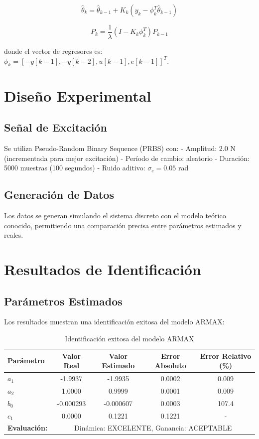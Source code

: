 \documentclass[a4paper,openright,9pt]{report}
\begin{document}
\[
\hat{\theta}_k = \hat{\theta}_{k-1} + K_k (y_k - \phi_k^T \hat{\theta}_{k-1})
\]

\[
P_k = \frac{1}{\lambda} (I - K_k \phi_k^T) P_{k-1}
\]

donde el vector de regresores es: $\phi_k = [-y[k-1], -y[k-2], u[k-1], e[k-1]]^T$.

\section{Diseño Experimental}

\subsection{Señal de Excitación}

Se utiliza Pseudo-Random Binary Sequence (PRBS) con:
- Amplitud: 2.0 N (incrementada para mejor excitación)
- Período de cambio: aleatorio
- Duración: 5000 muestras (100 segundos)
- Ruido aditivo: $\sigma_e = 0.05$ rad

\subsection{Generación de Datos}

Los datos se generan simulando el sistema discreto con el modelo teórico conocido, permitiendo una comparación precisa entre parámetros estimados y reales.

\section{Resultados de Identificación}

\subsection{Parámetros Estimados}

Los resultados muestran una identificación exitosa del modelo ARMAX:

\begin{table}[H]
\centering
\caption{Identificación exitosa del modelo ARMAX}
\label{tab:parametros_armax}
\begin{tabular}{@{}lcccc@{}}
\toprule
Parámetro & Valor Real & Valor Estimado & Error Absoluto & Error Relativo (\%) \\
\midrule
$a_1$ & -1.9937 & -1.9935 & 0.0002 & 0.009 \\
$a_2$ & 1.0000 & 0.9999 & 0.0001 & 0.009 \\
$b_0$ & -0.000293 & -0.000607 & 0.0003 & 107.4 \\
$c_1$ & 0.0000 & 0.1221 & 0.1221 & - \\
\midrule
\textbf{Evaluación:} & \multicolumn{4}{c}{Dinámica: EXCELENTE, Ganancia: ACEPTABLE} \\
\bottomrule
\end{tabular}
\end{table}
\end{document}
